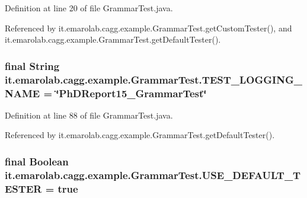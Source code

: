 Definition at line 20 of file Grammar\-Test.\-java.



Referenced by it.\-emarolab.\-cagg.\-example.\-Grammar\-Test.\-get\-Custom\-Tester(), and it.\-emarolab.\-cagg.\-example.\-Grammar\-Test.\-get\-Default\-Tester().

\hypertarget{classit_1_1emarolab_1_1cagg_1_1example_1_1GrammarTest_a3b8263975e23aa494ceae78879f1297d}{
\subsubsection[{T\-E\-S\-T\-\_\-\-L\-O\-G\-G\-I\-N\-G\-\_\-\-N\-A\-M\-E}]{\setlength{\rightskip}{0pt plus 5cm}final String it.\-emarolab.\-cagg.\-example.\-Grammar\-Test.\-T\-E\-S\-T\-\_\-\-L\-O\-G\-G\-I\-N\-G\-\_\-\-N\-A\-M\-E = \char`\"{}Ph\-D\-Report15\-\_\-\-Grammar\-Test\char`\"{}\hspace{0.3cm}{\ttfamily [static]}}}\label{classit_1_1emarolab_1_1cagg_1_1example_1_1GrammarTest_a3b8263975e23aa494ceae78879f1297d}


Definition at line 88 of file Grammar\-Test.\-java.



Referenced by it.\-emarolab.\-cagg.\-example.\-Grammar\-Test.\-get\-Default\-Tester().

\hypertarget{classit_1_1emarolab_1_1cagg_1_1example_1_1GrammarTest_a377d05850775b10a1617a3dac6af9ff2}{
\subsubsection[{U\-S\-E\-\_\-\-D\-E\-F\-A\-U\-L\-T\-\_\-\-T\-E\-S\-T\-E\-R}]{\setlength{\rightskip}{0pt plus 5cm}final Boolean it.\-emarolab.\-cagg.\-example.\-Grammar\-Test.\-U\-S\-E\-\_\-\-D\-E\-F\-A\-U\-L\-T\-\_\-\-T\-E\-S\-T\-E\-R = true\hspace{0.3cm}{\ttfamily [static]}}}\label{classit_1_1emarolab_1_1cagg_1_1example_1_1GrammarTest_a377d05850775b10a1617a3dac6af9ff2}


